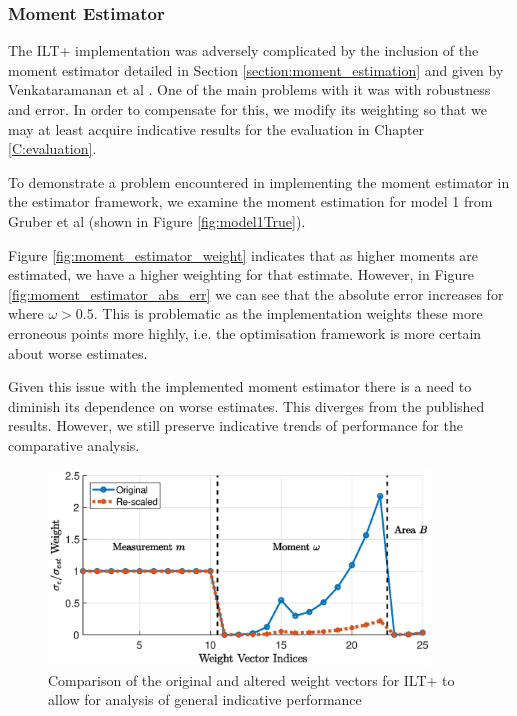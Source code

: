 \subsubsection{Moment Estimator} \label{section:moment_est_implementation}
The ILT+ implementation was adversely complicated by the inclusion of the moment estimator detailed in Section \ref{section:moment_estimation} and given by Venkataramanan et al \cite{VenkMellin2010}. One of the main problems with it was with robustness and error. In order to compensate for this, we modify its weighting so that we may at least acquire indicative results for the evaluation in Chapter \ref{C:evaluation}.




To demonstrate a problem encountered in implementing the moment estimator in the estimator framework, we examine the moment estimation for model 1 from Gruber et al \cite{GruberT2Estimation2013} (shown in Figure \ref{fig:model1True}). 



Figure \ref{fig:moment_estimator_weight} indicates that as higher moments are estimated, we have a higher weighting for that estimate. However, in Figure \ref{fig:moment_estimator_abs_err} we can see that the absolute error increases for where $\omega > 0.5$. This is problematic as the implementation weights these more erroneous points more highly, i.e. the optimisation framework is more certain about worse estimates.

Given this issue with the implemented moment estimator there is a need to diminish its dependence on worse estimates. This diverges from the published results. However, we still preserve indicative trends of performance for the comparative analysis.

\begin{figure}[htb!]
    \centering
    \includegraphics[width = 0.9\textwidth]{implementation/new_weighting_iltx.eps}
    \caption{Comparison of the original and altered weight vectors for ILT+ to allow for analysis of general indicative performance}
    \label{fig:diff_ILT+}
\end{figure}

